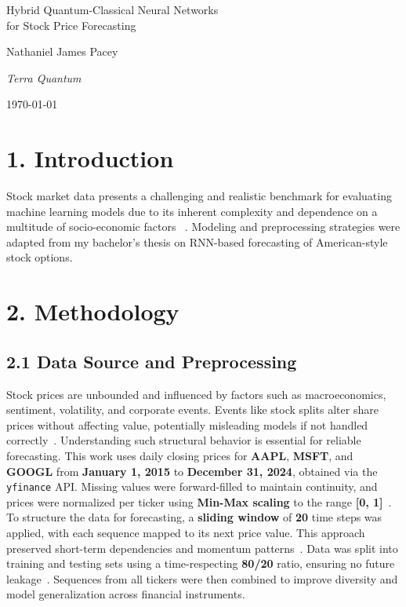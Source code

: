 \documentclass[10pt]{article}
\begin{document}
\begin{titlepage}
    \centering
    \vspace*{5cm}
    {\LARGE Hybrid Quantum-Classical Neural Networks\\ for Stock Price Forecasting\par}
    \vspace{3cm}
    {\Large Nathaniel James Pacey\par}
    \vspace{0.5cm}
    {\large \textit{Terra Quantum}\par}
    \vfill
    {\large \today\par}
\end{titlepage}

\section*{1. Introduction}

Stock market data presents a challenging and realistic benchmark for evaluating machine learning models due to its inherent complexity and dependence on a multitude of socio-economic factors ~\cite{madisson2019stockrnn, chen2023options}. Modeling and preprocessing strategies were adapted from my bachelor's thesis on RNN-based forecasting of American-style stock options.



\section*{2. Methodology}
\subsection*{2.1 Data Source and Preprocessing}

Stock prices are unbounded and influenced by factors such as macroeconomics, sentiment, volatility, and corporate events. Events like stock splits alter share prices without affecting value, potentially misleading models if not handled correctly~\cite{jahan2018stock, chen2023options}. Understanding such structural behavior is essential for reliable forecasting. This work uses daily closing prices for \textbf{AAPL}, \textbf{MSFT}, and \textbf{GOOGL} from \textbf{January 1, 2015} to \textbf{December 31, 2024}, obtained via the \texttt{yfinance} API. Missing values were forward-filled to maintain continuity, and prices were normalized per ticker using \textbf{Min-Max scaling} to the range \textbf{[0, 1]}~\cite{lesuisse2022americanoptions}. To structure the data for forecasting, a \textbf{sliding window} of \textbf{20} time steps was applied, with each sequence mapped to its next price value. This approach preserved short-term dependencies and momentum patterns~\cite{fischer2018lstm}. Data was split into training and testing sets using a time-respecting \textbf{80/20} ratio, ensuring no future leakage~\cite{fischer2018lstm}. Sequences from all tickers were then combined to improve diversity and model generalization across financial instruments.
\end{document}
